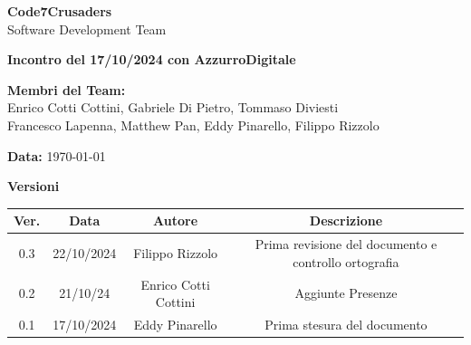 \documentclass{article}
\begin{document}
\begin{titlepage}
    {\Huge \textbf{Code7Crusaders}}\\
    \vspace{0.5cm}
    {\Large Software Development Team}\\
    \vspace{2cm}
    
    {\large \textbf{Incontro del 17/10/2024 con AzzurroDigitale}}\\
    \vspace{5cm}

    \textbf{Membri del Team:}\\
    Enrico Cotti Cottini, Gabriele Di Pietro, Tommaso Diviesti \\
    Francesco Lapenna, Matthew Pan, Eddy Pinarello, Filippo Rizzolo \\
    \vspace{0.5cm}
    
    {\large \textbf{Data:}} \today\\
    
    \vspace{1cm}
\end{titlepage}

\tableofcontents
\newpage
\begin{center}
    \textbf{Versioni}
    \\
    \begin{tabular}{|c|c|c|c|}
        \hline
        \textbf{Ver.} & \textbf{Data} & \textbf{Autore} & \textbf{Descrizione} \\
        \hline
        0.3 & 22/10/2024 & Filippo Rizzolo & Prima revisione del documento e controllo ortografia \\ 
	    \hline
	    0.2 & 21/10/24 & Enrico Cotti Cottini & Aggiunte Presenze \\
        \hline
        0.1 & 17/10/2024 & Eddy Pinarello & Prima stesura del documento  \\ 
        \hline
    \end{tabular}
\end{center}

\newpage
\tableofcontents
\newpage

\newpage
\end{document}
